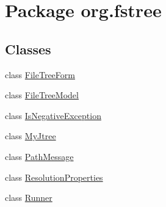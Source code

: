 \hypertarget{namespaceorg_1_1fstree}{
\section{Package org.fstree}
\label{namespaceorg_1_1fstree}
}
\subsection*{Classes}
\begin{DoxyCompactItemize}
\item 
class \hyperlink{classorg_1_1fstree_1_1_file_tree_form}{FileTreeForm}
\item 
class \hyperlink{classorg_1_1fstree_1_1_file_tree_model}{FileTreeModel}
\item 
class \hyperlink{classorg_1_1fstree_1_1_is_negative_exception}{IsNegativeException}
\item 
class \hyperlink{classorg_1_1fstree_1_1_my_jtree}{MyJtree}
\item 
class \hyperlink{classorg_1_1fstree_1_1_path_message}{PathMessage}
\item 
class \hyperlink{classorg_1_1fstree_1_1_resolution_properties}{ResolutionProperties}
\item 
class \hyperlink{classorg_1_1fstree_1_1_runner}{Runner}
\end{DoxyCompactItemize}
